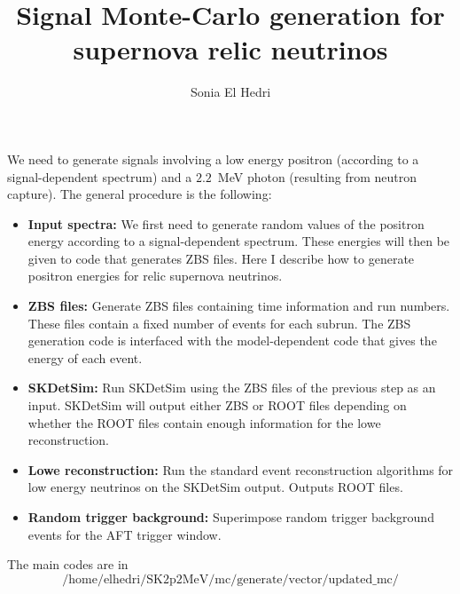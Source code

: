 \documentclass[12pt]{article}
\title{Signal Monte-Carlo generation for supernova relic neutrinos}
\author{Sonia El Hedri}
\begin{document}
    \maketitle
    We need to generate signals involving a low energy positron (according to a signal-dependent spectrum) and a $2.2$~MeV photon (resulting from neutron capture). The general procedure is the following:
    \begin{itemize}
        \item \textbf{Input spectra: } We first need to generate random values of the positron energy according to a signal-dependent spectrum. These energies will then be given to code that generates ZBS files. Here I describe how to generate positron energies for relic supernova neutrinos.
        \item \textbf{ZBS files: } Generate ZBS files containing time information and run numbers. These files contain a fixed number of events for each subrun. The ZBS generation code is interfaced with the model-dependent code that gives the energy of each event.
        \item \textbf{SKDetSim: } Run SKDetSim using the ZBS files of the previous step as an input. SKDetSim will output either ZBS or ROOT files depending on whether the ROOT files contain enough information for the lowe reconstruction.
        \item \textbf{Lowe reconstruction: } Run the standard event reconstruction algorithms for low energy neutrinos on the SKDetSim output. Outputs ROOT files.
        \item \textbf{Random trigger background: } Superimpose random trigger background events for the AFT trigger window.
    \end{itemize}
    The main codes are in 
    $$\mathtt{\mathrm{/home/elhedri/SK2p2MeV/mc/generate/vector/updated\_mc/}}$$
\end{document}
